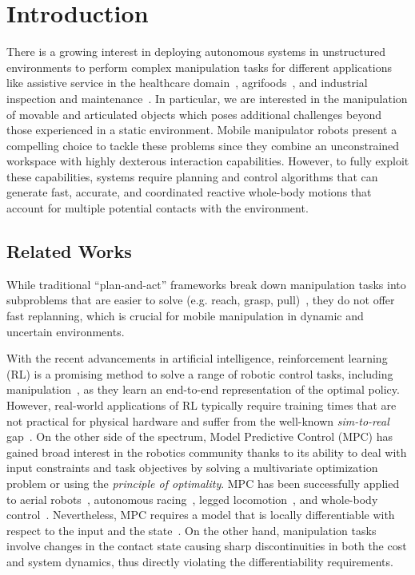 \section{Introduction} \label{sec:introduction}
\showthe\font
There is a growing interest in deploying autonomous systems in unstructured environments to perform complex manipulation tasks for different applications like assistive service in the healthcare domain~\cite{cooper2020ari}, agrifoods~\cite{duckett2018agricultural}, and industrial inspection and maintenance~\cite{lattanzi2017review}. In particular, we are interested in the manipulation of movable and articulated objects which poses additional challenges beyond those experienced in a static environment. Mobile manipulator robots present a compelling choice to tackle these problems since they combine an unconstrained workspace with highly dexterous interaction capabilities. However, to fully exploit these capabilities, systems require planning and control algorithms that can generate fast, accurate, and coordinated reactive whole-body motions that account for multiple potential contacts with the environment. 

\subsection{Related Works}

While traditional ``plan-and-act'' frameworks break down manipulation tasks into subproblems that are easier to solve (e.g. reach, grasp, pull)~\cite{Murali2020}, they do not offer fast replanning, which is crucial for mobile manipulation in dynamic and uncertain environments.

With the recent advancements in artificial intelligence, reinforcement learning (RL) is a promising method to solve a range of robotic control tasks, including manipulation~\cite{finn2016deep}, as they learn an end-to-end representation of the optimal policy. However, real-world applications of RL typically require training times that are not practical for physical hardware and suffer from the well-known \textit{sim-to-real} gap~\cite{chebotar2019closing}. 
On the other side of the spectrum, Model Predictive Control (MPC) has gained broad interest in the robotics community thanks to its ability to deal with input constraints and task objectives by solving a multivariate optimization problem or using the \textit{principle of optimality}. 
MPC has been successfully applied to aerial robots~\cite{peric2021direct}, autonomous racing~\cite{liniger2015optimization}, legged locomotion~\cite{grandia2019frequency}, and whole-body control~\cite{minniti2019whole}. 
Nevertheless, MPC requires a model that is locally differentiable with respect to the input and the state~\cite{buchli2017optimal}. On the other hand, manipulation tasks involve changes in the contact state causing sharp discontinuities in both the cost and system dynamics, thus directly violating the differentiability requirements. 


